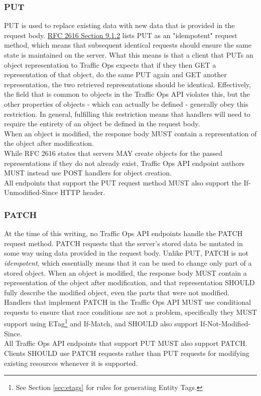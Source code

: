 \subsubsection{PUT}
PUT is used to replace existing data with new data that is provided in the request body.
\href{https://tools.ietf.org/html/rfc2616#section-9.1.2}{RFC 2616 Section 9.1.2} lists PUT as an "idempotent" request method, which means that
subsequent identical requests should ensure the same state is maintained on the server. What this means is that a client that PUTs an object
representation to Traffic Ops expects that if they then GET a representation of that object, do the same PUT again and GET another representation,
the two retrieved representations should be identical. Effectively, the  field that is common to objects in the Traffic Ops API
violates this, but the other properties of objects - which can actually be defined - generally obey this restriction. In general, fulfilling this
restriction means that handlers will need to require the entirety of an object be defined in the request body.\\
When an object is modified, the response body MUST contain a representation of
the object after modification.\\
While RFC 2616 states that servers MAY create objects for the passed representations if they do not already exist, Traffic Ops API endpoint authors
MUST instead use POST handlers for object creation.\\
All endpoints that support the PUT request method MUST also support the
If-Unmodified-Since HTTP header.

\subsubsection{PATCH}
At the time of this writing, no Traffic Ops API endpoints handle the PATCH request method. PATCH requests that the server's stored data be mutated
in some way using data provided in the request body. Unlike PUT, PATCH is not \emph{idempotent}, which essentially means that it can be used to
change only part of a stored object. When an object is modified, the response body MUST contain a representation of the object after modification,
and that representation SHOULD fully describe the modified object, even the parts that were not modified.\\
Handlers that implement PATCH in the Traffic Ops API MUST use conditional
requests to ensure that race conditions are not a problem, specifically they
MUST support using ETag\footnote{See Section \ref{sec:etags} for rules for
generating Entity Tags.} and If-Match, and SHOULD also support
If-Not-Modified-Since.\\
All Traffic Ops API endpoints that support PUT MUST also support PATCH.
Clients SHOULD use PATCH requests rather than PUT requests for modifying existing resources whenever it is supported.

